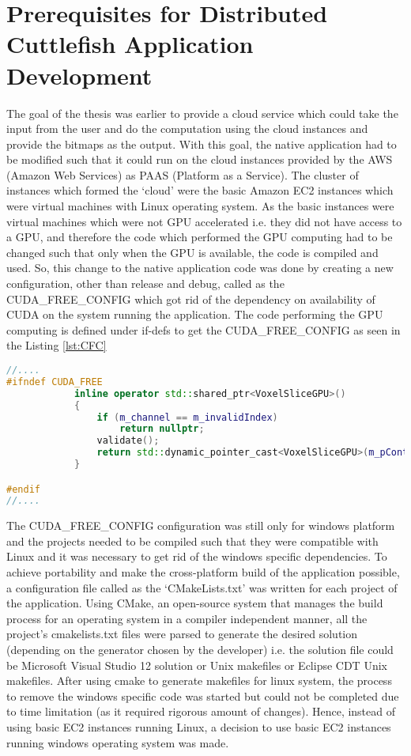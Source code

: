 \section{Prerequisites for Distributed Cuttlefish Application Development} 

The goal of the thesis was earlier to provide a cloud service which could take the input from the user and do the computation using the cloud instances and provide the bitmaps as the output. With this goal, the native application had to be modified such that it could run on the cloud instances provided by the AWS (Amazon Web Services) as PAAS (Platform as a Service). The cluster of instances which formed the {\lq}cloud{\rq} were the basic Amazon EC2 instances which were virtual machines with Linux operating system. As the basic instances were virtual machines which were not GPU accelerated i.e. they did not have access to a GPU, and therefore the code which performed the GPU computing had to be changed such that only when the GPU is available, the code is compiled and used. So, this change to the native application code was done by creating a new configuration, other than release and debug, called as the CUDA\_FREE\_CONFIG which got rid of the dependency on availability of CUDA on the system running the application. The code performing the GPU computing is defined under if-defs to get the CUDA\_FREE\_CONFIG as seen in the Listing \ref{lst:CFC}

\begin{lstlisting}[language=C++,label={lst:CFC},caption={CUDA free configuration}]
//....
#ifndef CUDA_FREE	
			inline operator std::shared_ptr<VoxelSliceGPU>()
			{
				if (m_channel == m_invalidIndex)
					return nullptr;
				validate();
				return std::dynamic_pointer_cast<VoxelSliceGPU>(m_pContainer->m_slices[m_channel][m_slice]);
			}

#endif
//....
\end{lstlisting}

The CUDA\_FREE\_CONFIG configuration was still only for windows platform and the projects needed to be compiled such that they were compatible with Linux and it was necessary to get rid of the windows specific dependencies. To achieve portability and make the cross-platform build of the application possible, a configuration file called as the {\lq}CMakeLists.txt{\rq}  was written for each project of the application. Using CMake, an open-source system that manages the build process for an operating system in a compiler independent manner, all the project's cmakelists.txt files were parsed to generate the desired solution (depending on the generator chosen by the developer) i.e. the solution file could be Microsoft Visual Studio 12 solution or Unix makefiles or Eclipse CDT Unix makefiles. After using cmake to generate makefiles for linux system, the process to remove the windows specific code was started but could not be completed  due to time limitation (as it required rigorous amount of changes). Hence, instead of using basic EC2 instances running Linux, a decision to use basic EC2 instances running windows operating system was made.    

